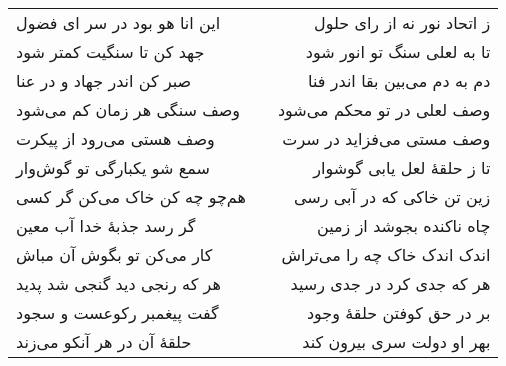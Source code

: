 \begin{center}
\begin{longtable}{l p{0.5cm} r}
\\
این انا هو بود در سر ای فضول
&&
ز اتحاد نور نه از رای حلول
\\
جهد کن تا سنگیت کمتر شود
&&
تا به لعلی سنگ تو انور شود
\\
صبر کن اندر جهاد و در عنا
&&
دم به دم می‌بین بقا اندر فنا
\\
وصف سنگی هر زمان کم می‌شود
&&
وصف لعلی در تو محکم می‌شود
\\
وصف هستی می‌رود از پیکرت
&&
وصف مستی می‌فزاید در سرت
\\
سمع شو یکبارگی تو گوش‌وار
&&
تا ز حلقهٔ لعل یابی گوشوار
\\
هم‌چو چه کن خاک می‌کن گر کسی
&&
زین تن خاکی که در آبی رسی
\\
گر رسد جذبهٔ خدا آب معین
&&
چاه ناکنده بجوشد از زمین
\\
کار می‌کن تو بگوش آن مباش
&&
اندک اندک خاک چه را می‌تراش
\\
هر که رنجی دید گنجی شد پدید
&&
هر که جدی کرد در جدی رسید
\\
گفت پیغمبر رکوعست و سجود
&&
بر در حق کوفتن حلقهٔ وجود
\\
حلقهٔ آن در هر آنکو می‌زند
&&
بهر او دولت سری بیرون کند
\\
\end{longtable}
\end{center}
